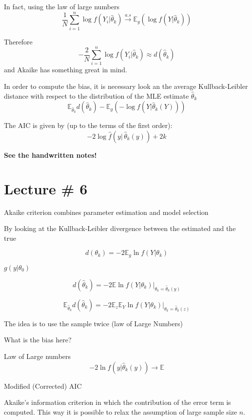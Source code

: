\documentclass[a4paper]{article}
\newcommand{\brac}[1]{{\left ( #1 \right )}}
\newcommand{\induc}[1]{{\left . #1 \right \vert}}
\newcommand{\Ex}[0]{{\mathbb{E}}}
\begin{document}
In fact, using the law of large numbers
\[\frac{1}{N} \sum_{i=1}^n \log f(Y_i|\hat{\theta}_k) \overset{a.s}{\to} \Ex_g\brac{\log f(\induc{Y}\hat{\theta}_k)}\]

Therefore
\[-\frac{2}{N} \sum_{i=1}^n \log f(Y_i|\hat{\theta}_k) \approx d(\hat{\theta}_k)\] and Akaike has something great in mind.

In order to compute the bias, it is necessary look an the average Kullback-Leibler distance with respect to the distribution of the MLE estimate $\hat{\theta}_k$
\[\Ex_{\hat{\theta}_k} d(\hat{\theta}_k) - \Ex_g\brac{- \log f\brac{\induc{Y}\hat{\theta}_k(Y)}}\]

The AIC is given by (up to the terms of the first order):
\[-2\log \hat{f}\brac{\induc{y}\,\hat{\theta}_k(y)} + 2k\]

\textbf{ See the handwritten notes! }





\clearpage
\section{Lecture \# 6} %
\label{sec:lecture_6}

Akaike criterion combines parameter estimation and model selection

By looking at the Kullback-Leibler divergence between the estimated and the true

\[d(\theta_k) = - 2 \Ex_g \ln f\brac{\induc{Y}\theta_k}\]

$g(y\vert \theta_0)$

\[d(\hat{\theta}_k) = - 2 \induc{\Ex \ln f\brac{\induc{Y}\theta_k}}_{\theta_k = \hat{\theta}_k(y)}\]

\[\Ex_{\hat{\theta}_k} d(\hat{\theta}_k) = - 2 \induc{\Ex_z \Ex_Y \ln f\brac{\induc{Y}\theta_k}}_{\theta_k = \hat{\theta}_k(z)}\]

The idea is to use the sample twice (law of Large Numbers)

What is the bias here?

Law of Large numbers
\[-2 \ln f\brac{\induc{y}\hat{\theta}_k(y)} \to \Ex \]

Modified (Corrected) AIC

Akaike's information criterion in which the contribution of the error term is computed.
This way it is possible to relax the assumption of large sample size $n$.
\end{document}

